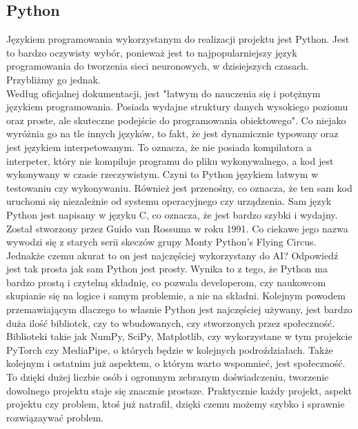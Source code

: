 \documentclass[12pt]{article}
\begin{document}
\begin{sloppypar}
{  \subsection{Python}
  {
    Językiem programowania wykorzystanym do realizacji projektu jest Python. 
    Jest to bardzo oczywisty wybór, ponieważ jest to najpopularniejszy język programowania do tworzenia sieci neuronowych, w dzisiejszych czasach.
    Przybliżmy go jednak. \\
    Według oficjalnej dokumentacji, jest "łatwym do nauczenia się i potężnym językiem programowania. 
    Posiada wydajne struktury danych wysokiego poziomu oraz proste, ale skuteczne podejście do programowania obiektowego"\cite{python-docs}.
    Co niejako wyróżnia go na tle innych języków, to fakt, że jest dynamicznie typowany oraz jest językiem interpetowanym. 
    To oznacza, że nie posiada kompilatora a interpeter, który nie kompiluje programu do pliku wykonywalnego, a kod jest wykonywany w czasie rzeczywistym.
    Czyni to Python językiem łatwym w testowaniu czy wykonywaniu. Również jest przenośny, co oznacza, że ten sam kod uruchomi się niezależnie od systemu operacyjnego czy urządzenia.
    Sam język Python jest napisany w języku C, co oznacza, że jest bardzo szybki i wydajny. 
    Został stworzony przez Guido van Rossuma w roku 1991.
    Co ciekawe jego nazwa wywodzi się z starych serii skeczów grupy Monty Python’s Flying Circus.
    \newline
    Jednakże czemu akurat to on jest najczęściej wykorzystany do AI? Odpowiedź jest tak prosta jak sam Python jest prosty.
    Wynika to z tego, że Python ma bardzo prostą i czytelną składnię, co pozwala developerom, czy naukowcom skupianie się na logice i samym problemie, a nie na składni\cite{python-ai}.
    Kolejnym powodem przemawiającym dlaczego to własnie Python jest najczęściej używany, 
    jest bardzo duża ilość bibliotek, czy to wbudowanych, czy stworzonych przez społeczność. 
    Biblioteki takie jak NumPy, SciPy, Matplotlib, czy wykorzystane w tym projekcie PyTorch czy MediaPipe, o których będzie w kolejnych podroździałach.
    Także kolejnym i ostatnim już aspektem, o którym warto wspomnieć, jest społeczność. 
    To dzięki dużej liczbie osób i ogromnym zebranym doświadczeniu, tworzenie dowolnego projektu staje się znacznie prostsze. 
    Praktycznie każdy projekt, aspekt projektu czy problem, ktoś już natrafił, dzięki czemu możemy szybko i sprawnie rozwiązaywać problem.
  }
}
\end{sloppypar}
\end{document}
